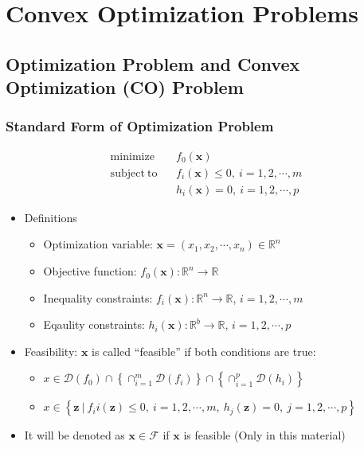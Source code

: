 \section{Convex Optimization Problems}

\subsection{Optimization Problem and Convex Optimization (CO) Problem}

\subsubsection*{Standard Form of Optimization Problem}
\begin{equation}\begin{aligned}
    \mathrm{minimize}~~&~~f_0(\mathbf{x}) \\
    \mathrm{subject~to}~~&~~f_i(\mathbf{x}) \leq 0,~i=1,2,\cdots,m \\
        &~~h_i(\mathbf{x}) = 0,~i=1,2,\cdots,p
\end{aligned}\end{equation}
\begin{itemize}
    \item Definitions
    \begin{itemize}
        \item Optimization variable: $\mathbf{x} = (x_1,x_2,\cdots,x_n) \in \mathbb{R}^n$
        \item Objective function: $f_0(\mathbf{x}): \mathbb{R}^n \rightarrow \mathbb{R}$
        \item Inequality constraints: $f_i(\mathbf{x}): \mathbb{R}^n \rightarrow \mathbb{R}$, $i=1,2,\cdots,m$
        \item Eqaulity constraints: $h_i(\mathbf{x}): \mathbb{R}^b \rightarrow \mathbb{R}$, $i=1,2,\cdots,p$
    \end{itemize}
    \item Feasibility: $\mathbf{x}$ is called ``feasible'' if both conditions are true:
    \begin{itemize}
        \item $x \in \mathcal{D}(f_0) \cap \left\{ \cap_{i=1}^m \mathcal{D}(f_i) \right\} \cap \left\{ \cap_{i=1}^p \mathcal{D}(h_i) \right\}$
        \item $x \in \left\{ \mathbf{z}~|~f_ii(\mathbf{z}) \leq 0,~i=1,2,\cdots,m,~h_j(\mathbf{z}) = 0,~j=1,2,\cdots,p \right\}$
    \end{itemize}
    \item It will be denoted as $\mathbf{x} \in \mathcal{F}$ if $\mathbf{x}$ is feasible (Only in this material)
\end{itemize}

